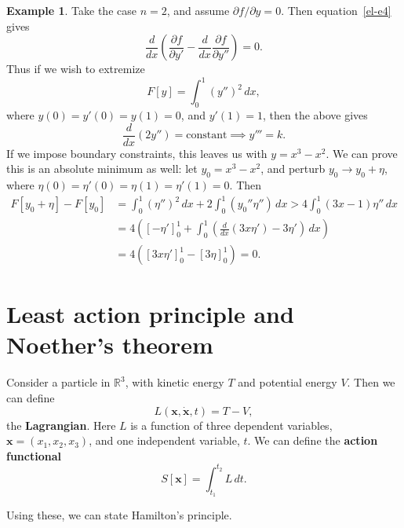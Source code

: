 \documentclass[12pt]{article}
\theoremstyle{definition}
\newtheorem{example}{Example}[section]
\theoremstyle{remark}
\begin{document}
\begin{adjustbox}{minipage = \columnwidth - 25.5pt, margin=1em, frame=1pt, margin=0em}
\begin{example}
	Take the case $n = 2$, and assume $\partial f/\partial y = 0$. Then equation~\eqref{el-e4} gives
	\[
		\frac{d}{dx} \left( \frac{\partial f}{\partial y'} - \frac{d}{dx} \frac{\partial f}{\partial y''} \right) = 0
	.\]
	Thus if we wish to extremize
	\[
		F[y] = \int_{0}^{1} (y'')^2 \, dx
	,\]
	where $y(0) = y'(0) = y(1) = 0$, and $y'(1) = 1$, then the above gives
	\[
		\frac{d}{dx} (2y'') = \text{constant} \implies y''' = k
	.\]
	If we impose boundary constraints, this leaves us with $y = x^3 - x^2$. We can prove this is an absolute minimum as well: let $y_0 = x^3 - x^2$, and perturb $y_0 \to y_0 + \eta$, where $\eta(0) = \eta'(0) = \eta(1) = \eta'(1) = 0$. Then
	\begin{align*}
		F[y_0 + \eta] - F[y_0] &= \int_{0}^{1} (\eta'')^2 \, dx + 2 \int_{0}^{1} (y_0'' \eta'') \, dx > 4 \int_{0}^{1} (3x - 1) \eta'' \, dx \\
				       &= 4\left( \left[-\eta'\right]_{0}^{1} + \int_{0}^{1} \left( \frac{d}{dx} (3x\eta') - 3\eta' \right) \, dx \right) \\
				       &= 4\left( \left[3x\eta'\right]_{0}^{1} - \left[3\eta\right]_{0}^{1} \right) = 0.
	\end{align*}
	
\end{example}

\end{adjustbox}

\newpage

\section{Least action principle and Noether's theorem}%
\label{sec:least_action_principle_and_noether_s_theorem}

Consider a particle in $\mathbb{R}^3$, with kinetic energy $T$ and potential energy $V$. Then we can define
\[
	L(\mathbf{x}, \mathbf{\dot x}, t) = T - V \tag{4.1}\label{eq:la}
,\]
the \textbf{Lagrangian}. Here $L$ is a function of three dependent variables, $\mathbf{x} = (x_1, x_2, x_3)$, and one independent variable, $t$. We can define the \textbf{action functional}
\[
	S[\mathbf{x}] = \int_{t_1}^{t_2} L \, dt \tag{4.2}\label{eq:af}
.\]

Using these, we can state Hamilton's principle.
\end{document}
